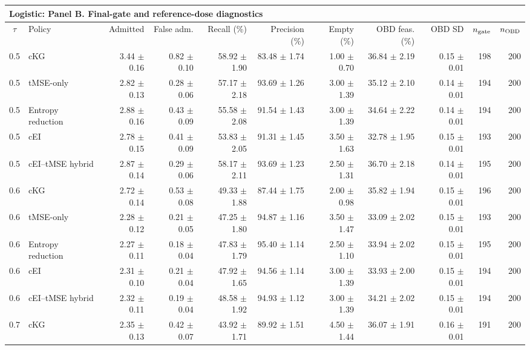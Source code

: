 \begin{tabular}{@{}clrrrrrrrrr@{}}
\multicolumn{11}{l}{\textbf{Logistic: Panel B. Final-gate and reference-dose diagnostics}} \\
\toprule
$\tau$ & Policy & Admitted & False adm. & Recall (\%) & Precision (\%) & Empty (\%) & OBD feas. (\%) & OBD SD & $n_{\rm gate}$ & $n_{\rm OBD}$ \\
\midrule
0.5 & cKG & 3.44 $\pm$ 0.16 & 0.82 $\pm$ 0.10 & 58.92 $\pm$ 1.90 & 83.48 $\pm$ 1.74 & 1.00 $\pm$ 0.70 & 36.84 $\pm$ 2.19 & 0.15 $\pm$ 0.01 & 198 & 200 \\
0.5 & tMSE-only & 2.82 $\pm$ 0.13 & 0.28 $\pm$ 0.06 & 57.17 $\pm$ 2.18 & 93.69 $\pm$ 1.26 & 3.00 $\pm$ 1.39 & 35.12 $\pm$ 2.10 & 0.14 $\pm$ 0.01 & 194 & 200 \\
0.5 & Entropy reduction & 2.88 $\pm$ 0.16 & 0.43 $\pm$ 0.09 & 55.58 $\pm$ 2.08 & 91.54 $\pm$ 1.43 & 3.00 $\pm$ 1.39 & 34.64 $\pm$ 2.22 & 0.14 $\pm$ 0.01 & 194 & 200 \\
0.5 & cEI & 2.78 $\pm$ 0.15 & 0.41 $\pm$ 0.09 & 53.83 $\pm$ 2.05 & 91.31 $\pm$ 1.45 & 3.50 $\pm$ 1.63 & 32.78 $\pm$ 1.95 & 0.15 $\pm$ 0.01 & 193 & 200 \\
0.5 & cEI--tMSE hybrid & 2.87 $\pm$ 0.14 & 0.29 $\pm$ 0.06 & 58.17 $\pm$ 2.11 & 93.69 $\pm$ 1.23 & 2.50 $\pm$ 1.31 & 36.70 $\pm$ 2.18 & 0.14 $\pm$ 0.01 & 195 & 200 \\
0.6 & cKG & 2.72 $\pm$ 0.14 & 0.53 $\pm$ 0.08 & 49.33 $\pm$ 1.88 & 87.44 $\pm$ 1.75 & 2.00 $\pm$ 0.98 & 35.82 $\pm$ 1.94 & 0.15 $\pm$ 0.01 & 196 & 200 \\
0.6 & tMSE-only & 2.28 $\pm$ 0.12 & 0.21 $\pm$ 0.05 & 47.25 $\pm$ 1.80 & 94.87 $\pm$ 1.16 & 3.50 $\pm$ 1.47 & 33.09 $\pm$ 2.02 & 0.15 $\pm$ 0.01 & 193 & 200 \\
0.6 & Entropy reduction & 2.27 $\pm$ 0.11 & 0.18 $\pm$ 0.04 & 47.83 $\pm$ 1.79 & 95.40 $\pm$ 1.14 & 2.50 $\pm$ 1.10 & 33.94 $\pm$ 2.02 & 0.15 $\pm$ 0.01 & 195 & 200 \\
0.6 & cEI & 2.31 $\pm$ 0.10 & 0.21 $\pm$ 0.04 & 47.92 $\pm$ 1.65 & 94.56 $\pm$ 1.14 & 3.00 $\pm$ 1.39 & 33.93 $\pm$ 2.00 & 0.15 $\pm$ 0.01 & 194 & 200 \\
0.6 & cEI--tMSE hybrid & 2.32 $\pm$ 0.11 & 0.19 $\pm$ 0.04 & 48.58 $\pm$ 1.92 & 94.93 $\pm$ 1.12 & 3.00 $\pm$ 1.39 & 34.21 $\pm$ 2.02 & 0.15 $\pm$ 0.01 & 194 & 200 \\
0.7 & cKG & 2.35 $\pm$ 0.13 & 0.42 $\pm$ 0.07 & 43.92 $\pm$ 1.71 & 89.92 $\pm$ 1.51 & 4.50 $\pm$ 1.44 & 36.07 $\pm$ 1.91 & 0.16 $\pm$ 0.01 & 191 & 200 \\

\end{tabular}
